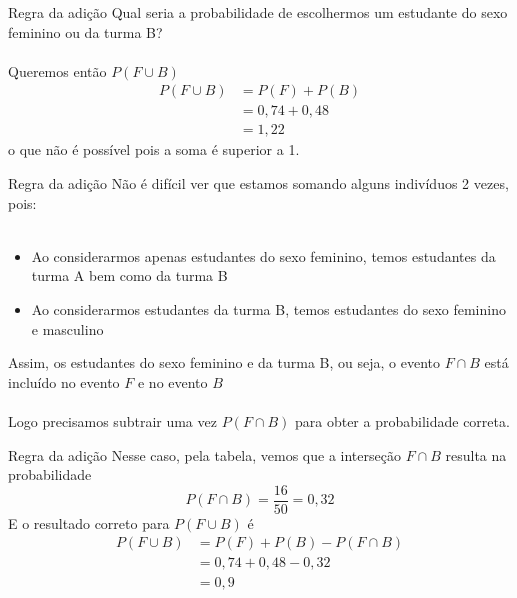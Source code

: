 \documentclass[10pt]{beamer}\usepackage[]{graphicx}\usepackage[]{color}
\theoremstyle{definition}
\begin{document}
\begin{frame}[fragile]{Regra da adição}
  Qual seria a probabilidade de escolhermos um estudante do sexo
  feminino ou da turma B? \\~\\ \pause
  Queremos então $P(F \cup B)$
  \begin{align*}
    P(F \cup B) &= P(F) + P(B) \\
    &= 0,74 + 0,48 \\
    &= 1,22
  \end{align*}
  o que não é possível pois a soma é superior a 1.
\end{frame}

\begin{frame}[fragile]{Regra da adição}
  Não é difícil ver que estamos somando alguns indivíduos 2 vezes, pois:
  \\~\\
  \begin{itemize}
  \item Ao considerarmos apenas estudantes do sexo feminino, temos
    estudantes da turma A bem como da turma B
  \item Ao considerarmos estudantes da turma B, temos estudantes do sexo
    feminino e masculino
  \end{itemize}
  \vspace{1em}
  Assim, os estudantes do sexo feminino e da turma B, ou seja, o evento
  $F \cap B$ está incluído no evento $F$ e no evento $B$ \\~\\
  Logo precisamos subtrair uma vez $P(F \cap B)$ para obter a
  probabilidade correta.
\end{frame}

\begin{frame}[fragile]{Regra da adição}
  Nesse caso, pela tabela, vemos que a interseção $F \cap B$ resulta na
  probabilidade
  \begin{equation*}
    P(F \cap B) = \frac{16}{50} = 0,32
  \end{equation*}
  E o resultado correto para $P(F \cup B)$ é
  \begin{align*}
    P(F \cup B) &= P(F) + P(B) - P(F \cap B) \\
    &= 0,74 + 0,48 - 0,32 \\
    &= 0,9
  \end{align*}
\end{frame}
\end{document}
